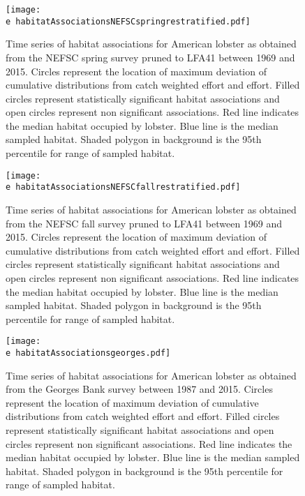 \documentclass[11pt]{article}
\newcommand{\e}{/backup/bio_data/bio.lobster/figures/} %
\begin{document}
\begin{figure}

    \texttt{[image: \\e habitatAssociationsNEFSCspringrestratified.pdf]}
    \caption{Time series of habitat associations for American lobster as obtained from the NEFSC spring survey pruned to LFA41 between 1969 and 2015. Circles represent the location of maximum deviation of cumulative distributions from catch weighted effort and effort. Filled circles represent statistically significant habitat associations and open circles represent non significant associations. Red line indicates the median habitat occupied by lobster. Blue line is the median sampled habitat. Shaded polygon in background is the 95th percentile for range of sampled habitat.}

\end{figure}

\begin{figure}

    \texttt{[image: \\e habitatAssociationsNEFSCfallrestratified.pdf]}
    \caption{Time series of habitat associations for American lobster as obtained from the NEFSC fall survey pruned to LFA41 between 1969 and 2015. Circles represent the location of maximum deviation of cumulative distributions from catch weighted effort and effort. Filled circles represent statistically significant habitat associations and open circles represent non significant associations. Red line indicates
the median habitat occupied by lobster. Blue line is the median sampled habitat. Shaded polygon in background is the 95th percentile for range of sampled habitat.}

\end{figure}


\begin{figure}

    \texttt{[image: \\e habitatAssociationsgeorges.pdf]}
    \caption{Time series of habitat associations for American lobster as obtained from the Georges Bank survey between 1987 and 2015. Circles represent the location of maximum deviation of cumulative distributions from catch weighted effort and effort. Filled circles represent statistically significant habitat associations and open circles represent non significant associations. Red line indicates the median habitat occupied by lobster. Blue line is the median sampled habitat. Shaded polygon in background is the 95th percentile for range of sampled habitat.}

\end{figure}
\end{document}
